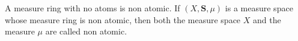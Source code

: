 A measure ring with no atoms is non atomic. If $(X,\mathbf{S},\mu)$ is a measure space whose measure ring is non atomic, then both the measure space $X$ and the measure $\mu$ are called non atomic.
